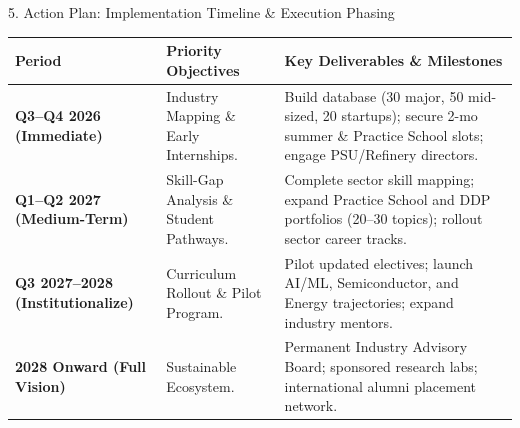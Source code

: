 \documentclass[aspectratio=169, 10pt]{beamer}
\begin{document}
\begin{frame}{5. Action Plan: Implementation Timeline \& Execution Phasing}
  \scriptsize
  \renewcommand{\arraystretch}{1.3}
  \centering
  \begin{tabular}{L{2.8cm} L{4.2cm} L{7.0cm}}
    \toprule
    \textbf{Period} & \textbf{Priority Objectives} & \textbf{Key Deliverables \& Milestones} \\
    \midrule
    \textbf{Q3--Q4 2026 (Immediate)} & Industry Mapping \& Early Internships. & Build database (30 major, 50 mid-sized, 20 startups); secure 2-mo summer \& Practice School slots; engage PSU/Refinery directors. \\
    \addlinespace[4pt]
    \textbf{Q1--Q2 2027 (Medium-Term)} & Skill-Gap Analysis \& Student Pathways. & Complete sector skill mapping; expand Practice School and DDP portfolios (20--30 topics); rollout sector career tracks. \\
    \addlinespace[4pt]
    \textbf{Q3 2027--2028 (Institutionalize)} & Curriculum Rollout \& Pilot Program. & Pilot updated electives; launch AI/ML, Semiconductor, and Energy trajectories; expand industry mentors. \\
    \addlinespace[4pt]
    \textbf{2028 Onward (Full Vision)} & Sustainable Ecosystem. & Permanent Industry Advisory Board; sponsored research labs; international alumni placement network. \\
    \bottomrule
  \end{tabular}
\end{frame}
\end{document}
